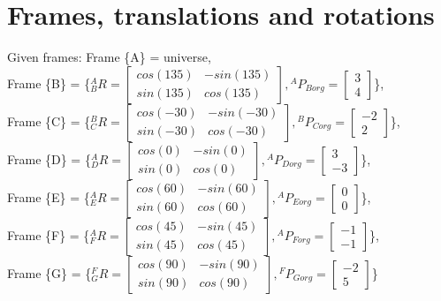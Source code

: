 \documentclass{article}
\begin{document}
\section{Frames, translations and rotations}
Given frames: Frame \{A\} = universe,\\ 
Frame \{B\} = \{${}^{A}_{B}R=\begin{bmatrix}
cos(135) & -sin(135) \\
sin(135) & cos(135)
\end{bmatrix} ,{}^{A}P_{Borg}=\begin{bmatrix}
3  \\
4 
\end{bmatrix} $\},\\
Frame \{C\} = \{${}^{B}_{C}R=\begin{bmatrix}
cos(-30) & -sin(-30) \\
sin(-30) & cos(-30)
\end{bmatrix} ,{}^{B}P_{Corg}=\begin{bmatrix}
-2  \\
2 
\end{bmatrix} $\},\\
Frame \{D\} = \{${}^{A}_{D}R=\begin{bmatrix}
cos(0) & -sin(0) \\
sin(0) & cos(0)
\end{bmatrix} ,{}^{A}P_{Dorg}=\begin{bmatrix}
3  \\
-3 
\end{bmatrix} $\},\\
Frame \{E\} = \{${}^{A}_{E}R=\begin{bmatrix}
cos(60) & -sin(60) \\
sin(60) & cos(60)
\end{bmatrix} ,{}^{A}P_{Eorg}=\begin{bmatrix}
0  \\
0 
\end{bmatrix} $\},\\
Frame \{F\} = \{${}^{A}_{F}R=\begin{bmatrix}
cos(45) & -sin(45) \\
sin(45) & cos(45)
\end{bmatrix} ,{}^{A}P_{Forg}=\begin{bmatrix}
-1  \\
-1 
\end{bmatrix} $\},\\
Frame \{G\} = \{${}^{F}_{G}R=\begin{bmatrix}
cos(90) & -sin(90) \\
sin(90) & cos(90)
\end{bmatrix} ,{}^{F}P_{Gorg}=\begin{bmatrix}
-2  \\
5 
\end{bmatrix} $\}\\\\
\end{document}
